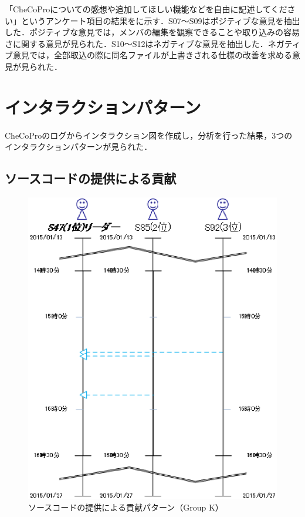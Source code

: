 「CheCoProについての感想や追加してほしい機能などを自由に記述してください」というアンケート項目の結果をに示す．S07〜S09はポジティブな意見を抽出した．ポジティブな意見では，メンバの編集を観察できることや取り込みの容易さに関する意見が見られた．S10〜S12はネガティブな意見を抽出した．ネガティブ意見では，全部取込の際に同名ファイルが上書きされる仕様の改善を求める意見が見られた．


\section{インタラクションパターン}

CheCoProのログからインタラクション図を作成し，分析を行った結果，3つのインタラクションパターンが見られた．


\subsection{ソースコードの提供による貢献}

\begin{figure}[h]
	\begin{center}
		\includegraphics[scale=0.75]{img/flowK.eps}
		\caption{ソースコードの提供による貢献パターン（Group K）}
		\label{fig:flowK}
	\end{center}
\end{figure}

